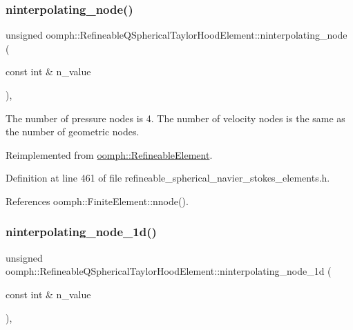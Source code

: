 \subsubsection{\texorpdfstring{ninterpolating\+\_\+node()}{ninterpolating\_node()}}
{\footnotesize\ttfamily unsigned oomph\+::\+Refineable\+Q\+Spherical\+Taylor\+Hood\+Element\+::ninterpolating\+\_\+node (\begin{DoxyParamCaption}\item[{const int \&}]{n\+\_\+value }\end{DoxyParamCaption})\hspace{0.3cm}{\ttfamily [inline]}, {\ttfamily [virtual]}}



The number of pressure nodes is 4. The number of velocity nodes is the same as the number of geometric nodes. 



Reimplemented from \hyperlink{classoomph_1_1RefineableElement_a8b1b5031b55141567ba24913a21534f4}{oomph\+::\+Refineable\+Element}.



Definition at line 461 of file refineable\+\_\+spherical\+\_\+navier\+\_\+stokes\+\_\+elements.\+h.



References oomph\+::\+Finite\+Element\+::nnode().

\mbox{\label{classoomph_1_1RefineableQSphericalTaylorHoodElement_aa722413e544ba7dc9fcd8c42ceb2060d}} 
\subsubsection{\texorpdfstring{ninterpolating\+\_\+node\+\_\+1d()}{ninterpolating\_node\_1d()}}
{\footnotesize\ttfamily unsigned oomph\+::\+Refineable\+Q\+Spherical\+Taylor\+Hood\+Element\+::ninterpolating\+\_\+node\+\_\+1d (\begin{DoxyParamCaption}\item[{const int \&}]{n\+\_\+value }\end{DoxyParamCaption})\hspace{0.3cm}{\ttfamily [inline]}, {\ttfamily [virtual]}}



